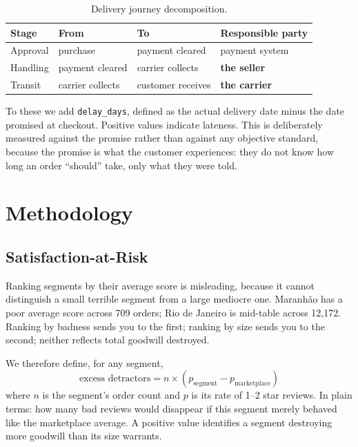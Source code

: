 \documentclass[11pt,a4paper]{article}
\begin{document}
\begin{table}[H]
\centering
\small
\caption{Delivery journey decomposition.}
\label{tab:stages}
\begin{tabular}{@{}llll@{}}
\toprule
\textbf{Stage} & \textbf{From} & \textbf{To} & \textbf{Responsible party}\\
\midrule
Approval & purchase & payment cleared & payment system\\
Handling & payment cleared & carrier collects & \textbf{the seller}\\
Transit & carrier collects & customer receives & \textbf{the carrier}\\
\bottomrule
\end{tabular}
\end{table}

To these we add \texttt{delay\_days}, defined as the actual delivery date minus the
date promised at checkout. Positive values indicate lateness. This is deliberately
measured against the promise rather than against any objective standard, because
the promise is what the customer experiences: they do not know how long an order
``should'' take, only what they were told.

\section{Methodology}

\subsection{Satisfaction-at-Risk}
\label{sec:sar}

Ranking segments by their average score is misleading, because it cannot
distinguish a small terrible segment from a large mediocre one. Maranh\~{a}o has a
poor average score across 709 orders; Rio de Janeiro is mid-table across 12{,}172.
Ranking by badness sends you to the first; ranking by size sends you to the second;
neither reflects total goodwill destroyed.

We therefore define, for any segment,
\begin{equation}
\text{excess detractors} = n \times (p_{\text{segment}} - p_{\text{marketplace}})
\end{equation}
where $n$ is the segment's order count and $p$ is its rate of 1--2 star reviews.
In plain terms: how many bad reviews would disappear if this segment merely behaved
like the marketplace average. A positive value identifies a segment destroying more
goodwill than its size warrants.
\end{document}
